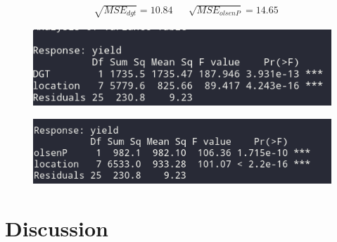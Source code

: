 \documentclass[12pt,fleqn]{article}
\begin{document}
\begin{align*}
	& \sqrt{MSE_{dgt}}	 = 10.84
	&& \sqrt{MSE_{olsenP}} = 14.65
\end{align*}



\begin{figure}[H]
	\centering
	\includegraphics[width=.7\linewidth]{anovaDGT}
\end{figure}
\begin{figure}[H]
	\centering
	\includegraphics[width=.7\linewidth]{anovaOP}
\end{figure}

\section{Discussion}
\end{document}
